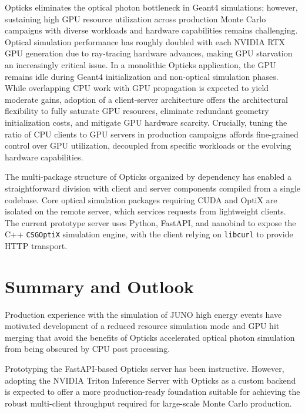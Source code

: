 \documentclass{webofc}
\begin{document}
Opticks eliminates the optical photon bottleneck in Geant4 simulations;
however, sustaining high GPU resource utilization across production Monte Carlo campaigns 
with diverse workloads and hardware capabilities remains challenging.
Optical simulation performance has roughly doubled with each NVIDIA RTX GPU generation 
due to ray-tracing hardware advances, making GPU starvation an increasingly critical issue.
In a monolithic Opticks application, the GPU remains idle during Geant4 initialization 
and non-optical simulation phases. 
While overlapping CPU work with GPU propagation is expected to yield moderate gains, adoption of
a client-server architecture offers the architectural flexibility to fully saturate GPU resources,
eliminate redundant geometry initialization costs, and mitigate GPU hardware scarcity. 
Crucially, tuning the ratio of CPU clients to GPU servers in production campaigns affords fine-grained 
control over GPU utilization, decoupled from specific workloads or the evolving hardware capabilities.

The multi-package structure of Opticks organized by dependency has enabled a
straightforward division with client and server components compiled from a single codebase.
Core optical simulation packages requiring CUDA and OptiX
are isolated on the remote server, which services requests from lightweight clients. 
The current prototype server uses Python, FastAPI, and nanobind to expose the C++ \texttt{CSGOptiX} simulation engine, 
with the client relying on \texttt{libcurl} to provide HTTP transport.


\section{Summary and Outlook}

Production experience with the simulation of JUNO high energy events
have motivated development of a reduced resource simulation mode and GPU hit merging
that avoid the benefits of Opticks accelerated optical photon simulation from being
obscured by CPU post processing.

Prototyping the FastAPI-based Opticks server has been instructive. However,
adopting the NVIDIA Triton Inference Server with Opticks as a custom backend
is expected to offer a more production-ready foundation suitable for achieving
the robust multi-client throughput required for large-scale Monte Carlo production.
\end{document}
